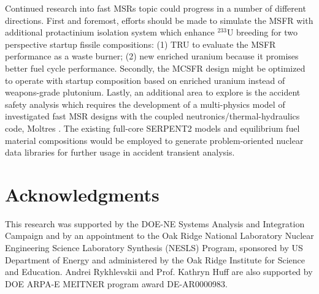 \documentclass[letterpaper]{mandc2019}
\begin{document}
Continued research into fast \glspl{MSR} topic could progress in a number of different directions. First and foremost, efforts should be made to simulate the \gls{MSFR} with additional protactinium isolation system which enhance $^{233}$U breeding for two perspective startup fissile compositions: (1) TRU to evaluate the \gls{MSFR} performance as a waste burner; (2) new enriched uranium because it promises better fuel cycle performance. Secondly, the \gls{MCSFR} design might be optimized to operate with startup composition based on enriched uranium instead of weapons-grade plutonium. Lastly, an additional area to explore is the accident safety analysis which requires the development of a multi-physics model of investigated fast \gls{MSR} designs with the coupled neutronics/thermal-hydraulics code, Moltres \cite{lindsay_introduction_2018}. The existing full-core SERPENT2 models and equilibrium fuel material compositions would be employed to generate problem-oriented nuclear data libraries for further usage
in accident transient analysis. 
\section{Acknowledgments}
This research was supported by the DOE-NE Systems Analysis and Integration Campaign and by an appointment to the Oak Ridge National Laboratory Nuclear Engineering Science Laboratory Synthesis (NESLS) Program, sponsored by US Department of Energy and administered by the Oak Ridge Institute for Science and Education. Andrei Rykhlevskii and Prof. Kathryn Huff are also supported by DOE ARPA-E MEITNER program award DE-AR0000983.
\setlength{\baselineskip}{12pt}


\end{document}
